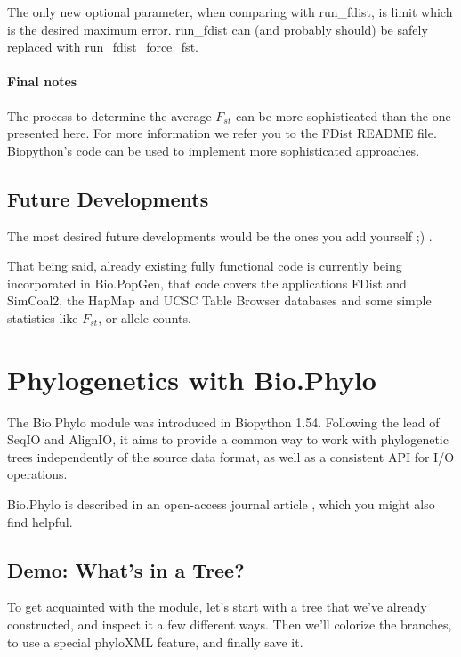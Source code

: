 \documentclass{report}
\begin{document}
The only new optional parameter, when comparing with run\_fdist, is limit
which is the desired maximum error. run\_fdist can (and probably should)
be safely replaced with run\_fdist\_force\_fst.

\subsubsection{Final notes}

The process to determine the average $F_{st}$ can be more sophisticated than
the one presented here. For more information we refer you to the FDist
README file. Biopython's code can be used to implement more sophisticated
approaches.

\section{Future Developments}

The most desired future developments would be the ones you add yourself ;) .

That being said, already existing fully functional code is currently being
incorporated in Bio.PopGen, that code covers the applications FDist and
SimCoal2, the HapMap and UCSC Table Browser databases and some simple statistics
like $F_{st}$, or allele counts.

\chapter{Phylogenetics with Bio.Phylo}
\label{sec:Phylo}

The Bio.Phylo module was introduced in Biopython 1.54. Following the lead of SeqIO and AlignIO,
it aims to provide a common way to work with phylogenetic trees independently of the source data
format, as well as a consistent API for I/O operations.

Bio.Phylo is described in an open-access journal article \cite[Talevich
\textit{et al.}, 2012]{talevich2012}, which you might also find helpful.

\section{Demo: What's in a Tree?}

To get acquainted with the module, let's start with a tree that we've already constructed, and
inspect it a few different ways.  Then we'll colorize the branches, to use a special phyloXML
feature, and finally save it.
\end{document}
